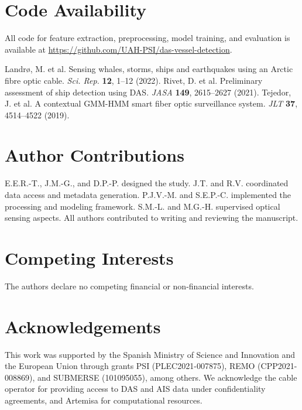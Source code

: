 \documentclass[11pt]{article}
\begin{document}
\section*{Code Availability}
All code for feature extraction, preprocessing, model training, and evaluation is available at \url{https://github.com/UAH-PSI/das-vessel-detection}.

\begin{thebibliography}{9}
 Landr\o, M. et al. Sensing whales, storms, ships and earthquakes using an Arctic fibre optic cable. \textit{Sci. Rep.} \textbf{12}, 1–12 (2022).
 Rivet, D. et al. Preliminary assessment of ship detection using DAS. \textit{JASA} \textbf{149}, 2615–2627 (2021).
 Tejedor, J. et al. A contextual GMM-HMM smart fiber optic surveillance system. \textit{JLT} \textbf{37}, 4514–4522 (2019).
\end{thebibliography}

\section*{Author Contributions}
E.E.R.-T., J.M.-G., and D.P.-P. designed the study. J.T. and R.V. coordinated data access and metadata generation. P.J.V.-M. and S.E.P.-C. implemented the processing and modeling framework. S.M.-L. and M.G.-H. supervised optical sensing aspects. All authors contributed to writing and reviewing the manuscript.

\section*{Competing Interests}
The authors declare no competing financial or non-financial interests.

\section*{Acknowledgements}
This work was supported by the Spanish Ministry of Science and Innovation and the European Union through grants PSI (PLEC2021-007875), REMO (CPP2021-008869), and SUBMERSE (101095055), among others. We acknowledge the cable operator for providing access to DAS and AIS data under confidentiality agreements, and Artemisa for computational resources.
\end{document}
